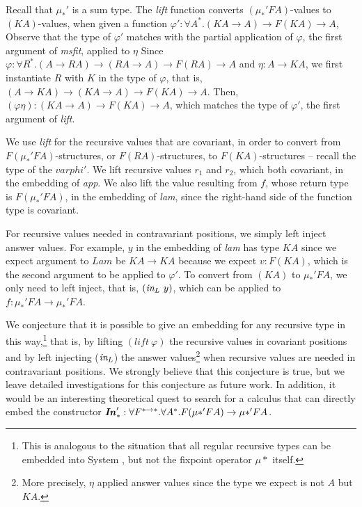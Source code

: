 Recall that $\mu_{*}'$ is a sum type. The \textit{lift} function converts
$(\mu_{*}'FA)$-values to $(KA)$-values, when given a function
$\varphi' : \forall A^{*}.(KA \to A) \to F(K A) \to A$,
Observe that the type of $\varphi'$ matches with the partial application of
$\varphi$, the first argument of \textit{msfit}, applied to $\eta$ Since
$\varphi : \forall R^{*}.(A \to R A) \to (R A \to A) \to F(R A) \to A$
and $\eta : A \to K A$, we first instantiate $R$ with $K$ in the type of
$\varphi$, that is, $(A \to K A) \to (K A \to A) \to F(K A) \to A$.
Then, $(\varphi\eta) : (K A \to A) \to F(K A) \to A$, which matches
the type of $\varphi'$, the first argument of \textit{lift}.

We use \textit{lift} for the recursive values that are covariant,
in order to convert from $F(\mu_{*}'FA)$-structures, or $F(RA)$-structures,
to $F(KA)$-structures -- recall the type of the $varphi'$.
We lift recursive values $r_1$ and $r_2$, which both covariant,
in the embedding of \textit{app}. We also lift the value resulting from $f$,
whose return type is $F(\mu_{*}'FA)$, in the embedding of \textit{lam},
since the right-hand side of the function type is covariant.

For recursive values needed in contravariant positions, we simply left inject
answer values. For example, $y$ in the embedding of \textit{lam} has type $KA$
since we expect argument to $Lam$ be $KA \to KA$ because we expect $v : F(KA)$,
which is the second argument to be applied to $\varphi'$. To convert from
$(KA)$ to $\mu_{*}'FA$, we only need to left inject, that is, $(\textit{in}_{L}~y)$,
which can be applied to $f : \mu_{*}'FA \to \mu_{*}'FA$.

We conjecture that it is possible to give an embedding for any recursive type
in this way,\footnote{This is analogous to the situation that
	all regular recursive types can be embedded into System \F,
	but not the fixpoint operator $\mu{*}$ itself.}
that is, by lifting $(\textit{lift}~\varphi)$ the recursive values in
covariant positions and by left injecting ($\textit{in}_{L}$) the answer values\footnote{
	More precisely, $\eta$ applied answer values
	since the type we expect is not $A$ but $K A$.}
when recursive values are needed in contravariant positions.
We strongly believe that this conjecture is true, but we leave
detailed investigations for this conjecture as future work.
In addition, it would be an interesting theoretical quest to search for
a calculus that can directly embed the constructor
$\textbf{\textit{In}}_{*}' : \forall F^{*\to*}.\forall A^{*}.F(\mu{*}' F A) \to \mu{*}' F A$.

